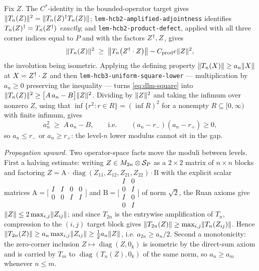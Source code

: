 Fix $Z$. The $C^*$-identity in the bounded-operator target gives
$\lVert T_n(Z)\rVert^{2}=\lVert T_n(Z)^{\dagger} T_n(Z)\rVert$; \texttt{lem-hcb2-amplified-adjointness}
identifies $T_n(Z)^{\dagger}=T_n(Z^{\dagger})$ \emph{exactly}; and
\texttt{lem-hcb2-product-defect}, applied with all three corner indices equal to $P$ and
with the factors $Z^{\dagger},Z$, gives
\begin{equation}\label{eq:dlm-square}
  \lVert T_n(Z)\rVert^{2}\;\ge\;\bigl\lVert T_n\bigl(Z^{\dagger}\mathbin{\cdot} Z\bigr)\bigr\rVert-C_{\mathrm{prod}}e\lVert Z\rVert^{2},
\end{equation}
the involution being isometric. Applying the defining property $\lVert T_n(X)\rVert\ge a_n\lVert X\rVert$
at $X=Z^{\dagger}\mathbin{\cdot} Z$ and then \texttt{lem-hcb3-uniform-square-lower} --- multiplication by
$a_n\ge0$ preserving the inequality --- turns \eqref{eq:dlm-square} into
$\lVert T_n(Z)\rVert^{2}\ge\bigl[A\,a_n-B\bigr]\lVert Z\rVert^{2}$. Dividing by $\lVert Z\rVert^{2}$ and taking
the infimum over nonzero $Z$, using that $\inf\{r^{2}:r\in R\}=(\inf R)^{2}$ for a nonempty
$R\subseteq[0,\infty)$ with finite infimum, gives
\begin{equation}\label{eq:dlm-quadratic}
  a_n^{2}\;\ge\;A\,a_n-B,
  \qquad\text{i.e.}\qquad (a_n-r_-)(a_n-r_+)\ge0 ,
\end{equation}
so $a_n\le r_-$ or $a_n\ge r_+$: the level-$n$ lower modulus cannot sit in the gap.

\emph{Propagation upward.} Two operator-space facts move the moduli between levels. First
a halving estimate: writing $Z\in M_{2n}\otimes \mathcal S_{P}$ as a $2\times2$ matrix of $n\times n$
blocks and factoring
$Z=\mathrm A\cdot\operatorname{diag}(Z_{11},Z_{12},Z_{21},Z_{22})\cdot\mathrm B$ with the
explicit scalar matrices
$\mathrm A=\bigl[\begin{smallmatrix}I&I&0&0\\0&0&I&I\end{smallmatrix}\bigr]$ and
$\mathrm B=\bigl[\begin{smallmatrix}I&0\\0&I\\I&0\\0&I\end{smallmatrix}\bigr]$ of norm
$\sqrt2$, the Ruan axioms give $\lVert Z\rVert\le2\max_{i,j}\lVert Z_{ij}\rVert$; and since $T_{2n}$ is
the entrywise amplification of $T_n$, compression to the $(i,j)$ target block gives
$\lVert T_{2n}(Z)\rVert\ge\max_{i,j}\lVert T_n(Z_{ij})\rVert$. Hence
$\lVert T_{2n}(Z)\rVert\ge a_n\max_{i,j}\lVert Z_{ij}\rVert\ge\tfrac12a_n\lVert Z\rVert$, i.e.
$a_{2n}\ge a_n/2$. Second a monotonicity: the zero-corner inclusion
$Z\mapsto\operatorname{diag}(Z,0_k)$ is isometric by the direct-sum axiom and is carried by
$T_m$ to $\operatorname{diag}(T_n(Z),0_k)$ of the same norm, so $a_n\ge a_m$ whenever
$n\le m$.

